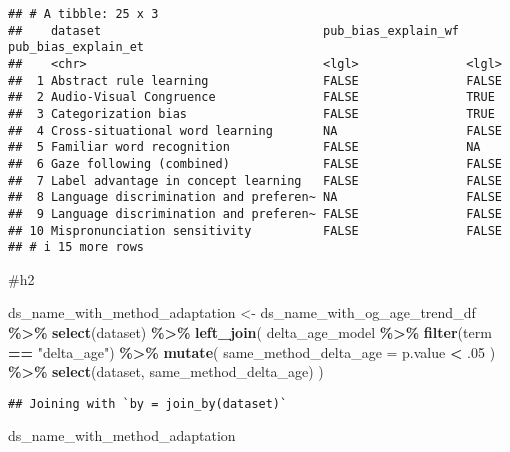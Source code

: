 \documentclass[
]{article}
\newenvironment{Shaded}{\begin{snugshade}}{\end{snugshade}}
\newcommand{\AttributeTok}[1]{\textcolor[rgb]{0.13,0.29,0.53}{#1}}
\newcommand{\DecValTok}[1]{\textcolor[rgb]{0.00,0.00,0.81}{#1}}
\newcommand{\FunctionTok}[1]{\textcolor[rgb]{0.13,0.29,0.53}{\textbf{#1}}}
\newcommand{\NormalTok}[1]{#1}
\newcommand{\OtherTok}[1]{\textcolor[rgb]{0.56,0.35,0.01}{#1}}
\newcommand{\SpecialCharTok}[1]{\textcolor[rgb]{0.81,0.36,0.00}{\textbf{#1}}}
\newcommand{\StringTok}[1]{\textcolor[rgb]{0.31,0.60,0.02}{#1}}
\begin{document}
\begin{verbatim}
## # A tibble: 25 x 3
##    dataset                               pub_bias_explain_wf pub_bias_explain_et
##    <chr>                                 <lgl>               <lgl>              
##  1 Abstract rule learning                FALSE               FALSE              
##  2 Audio-Visual Congruence               FALSE               TRUE               
##  3 Categorization bias                   FALSE               TRUE               
##  4 Cross-situational word learning       NA                  FALSE              
##  5 Familiar word recognition             FALSE               NA                 
##  6 Gaze following (combined)             FALSE               FALSE              
##  7 Label advantage in concept learning   FALSE               FALSE              
##  8 Language discrimination and preferen~ NA                  FALSE              
##  9 Language discrimination and preferen~ FALSE               FALSE              
## 10 Mispronunciation sensitivity          FALSE               FALSE              
## # i 15 more rows
\end{verbatim}

\#h2

\begin{Shaded}
\begin{Highlighting}[]
\NormalTok{ds\_name\_with\_method\_adaptation }\OtherTok{\textless{}{-}}\NormalTok{ ds\_name\_with\_og\_age\_trend\_df }\SpecialCharTok{\%\textgreater{}\%} 
  \FunctionTok{select}\NormalTok{(dataset) }\SpecialCharTok{\%\textgreater{}\%} 
  \FunctionTok{left\_join}\NormalTok{(}
\NormalTok{    delta\_age\_model }\SpecialCharTok{\%\textgreater{}\%} 
  \FunctionTok{filter}\NormalTok{(term }\SpecialCharTok{==} \StringTok{"delta\_age"}\NormalTok{) }\SpecialCharTok{\%\textgreater{}\%} 
  \FunctionTok{mutate}\NormalTok{(}
    \AttributeTok{same\_method\_delta\_age =}\NormalTok{ p.value }\SpecialCharTok{\textless{}}\NormalTok{ .}\DecValTok{05}
\NormalTok{  ) }\SpecialCharTok{\%\textgreater{}\%} 
  \FunctionTok{select}\NormalTok{(dataset, same\_method\_delta\_age)}
\NormalTok{  )}
\end{Highlighting}
\end{Shaded}

\begin{verbatim}
## Joining with `by = join_by(dataset)`
\end{verbatim}

\begin{Shaded}
\begin{Highlighting}[]
\NormalTok{ds\_name\_with\_method\_adaptation}
\end{Highlighting}
\end{Shaded}
\end{document}
